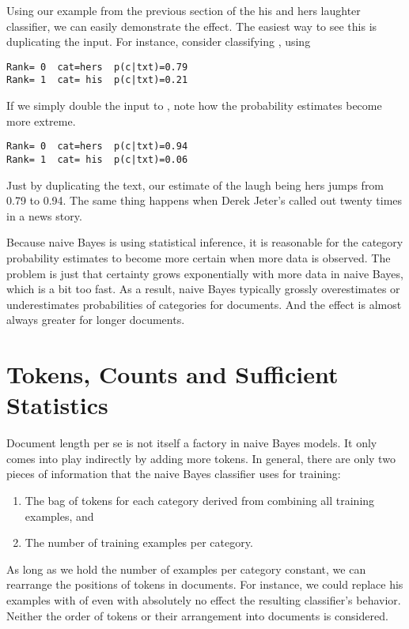 Using our example from the previous section of the his and hers
laughter classifier, we can easily demonstrate the effect.  The
easiest way to see this is duplicating the input.  For instance,
consider classifying , using
%
\begin{verbatim}
Rank= 0  cat=hers  p(c|txt)=0.79
Rank= 1  cat= his  p(c|txt)=0.21
\end{verbatim}
%
If we simply double the input to ,
note how the probability estimates become more extreme.
%
\begin{verbatim}
Rank= 0  cat=hers  p(c|txt)=0.94
Rank= 1  cat= his  p(c|txt)=0.06
\end{verbatim}
%
Just by duplicating the text, our estimate of the laugh being hers
jumps from 0.79 to 0.94.  The same thing happens when Derek Jeter's
called out twenty times in a news story.

Because naive Bayes is using statistical inference, it is reasonable
for the category probability estimates to become more certain when
more data is observed.  The problem is just that certainty grows
exponentially with more data in naive Bayes, which is a bit too fast.
As a result, naive Bayes typically grossly overestimates or
underestimates probabilities of categories for documents.  And
the effect is almost always greater for longer documents.

\section{Tokens, Counts and Sufficient Statistics}

Document length per se is not itself a factory in naive Bayes models.
It only comes into play indirectly by adding more tokens.  In general,
there are only two pieces of information that the naive Bayes classifier
uses for training:
%
\begin{enumerate}
\item The bag of tokens for each category derived from combining all
  training examples, and
\item The number of training examples per category.
\end{enumerate}
%
As long as we hold the number of examples per category constant, we
can rearrange the positions of tokens in documents.  For instance,
we could replace his examples
%
%
with
%
%
of even
%
%
with absolutely no effect the resulting classifier's behavior.  Neither
the order of tokens or their arrangement into documents is considered.

